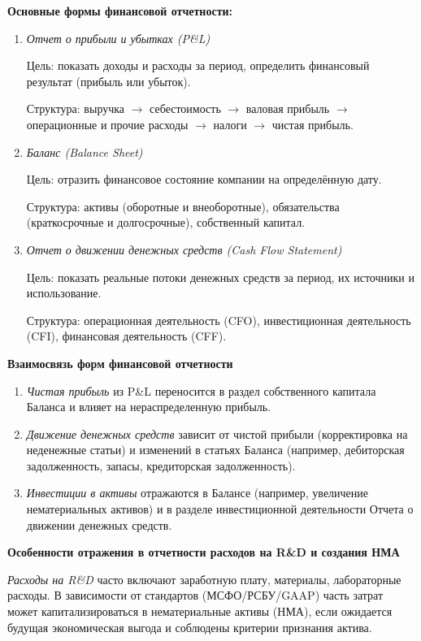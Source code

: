 \textbf{Основные формы финансовой отчетности:}
\begin{enumerate}
    \item \textit{Отчет о прибыли и убытках (P\&L)}
    
    Цель: показать доходы и расходы за период, определить финансовый результат (прибыль или убыток).
    
    Структура: выручка $\rightarrow$ себестоимость $\rightarrow$ валовая прибыль $\rightarrow$ операционные и прочие расходы $\rightarrow$ налоги $\rightarrow$ чистая прибыль.

    \item \textit{Баланс (Balance Sheet)}

    Цель: отразить финансовое состояние компании на определённую дату.
    
    Структура: активы (оборотные и внеоборотные), обязательства (краткосрочные и долгосрочные), собственный капитал.

    \item \textit{Отчет о движении денежных средств (Cash Flow Statement)}
    
    Цель: показать реальные потоки денежных средств за период, их источники и использование.
    
    Структура: операционная деятельность (CFO), инвестиционная деятельность (CFI), финансовая деятельность (CFF).
    
\end{enumerate}

\textbf{Взаимосвязь форм финансовой отчетности}

\begin{enumerate}
    \item \textit{Чистая прибыль} из P\&L переносится в раздел собственного капитала Баланса и влияет на нераспределенную прибыль.
    \item \textit{Движение денежных средств} зависит от чистой прибыли (корректировка на неденежные статьи) и изменений в статьях Баланса (например, дебиторская задолженность, запасы, кредиторская задолженность).
    \item \textit{Инвестиции в активы} отражаются в Балансе (например, увеличение нематериальных активов) и в разделе инвестиционной деятельности Отчета о движении денежных средств.
\end{enumerate}


\textbf{Особенности отражения в отчетности расходов на R\&D и создания НМА}

\textit{Расходы на R\&D} часто включают заработную плату, материалы, лабораторные расходы. В зависимости от стандартов (МСФО/РСБУ/GAAP) часть затрат может капитализироваться в нематериальные активы (НМА), если ожидается будущая экономическая выгода и соблюдены критерии признания актива.

